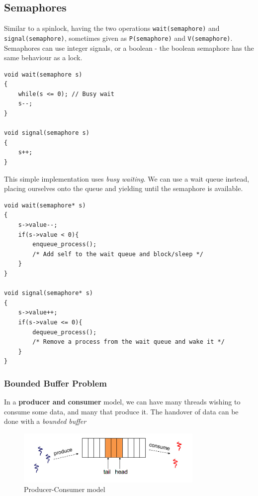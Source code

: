 \documentclass{article}
\begin{document}
\subsection{Semaphores}\label{semaphores}

Similar to a spinlock, having the two operations
\texttt{wait(semaphore)} and \texttt{signal(semaphore)}, sometimes given
as \texttt{P(semaphore)} and \texttt{V(semaphore)}. Semaphores can use
integer signals, or a boolean - the boolean semaphore has the same
behaviour as a lock.

\begin{verbatim}
void wait(semaphore s)
{
    while(s <= 0); // Busy wait
    s--;
}

void signal(semaphore s)
{
    s++;
}
\end{verbatim}

This simple implementation uses \emph{busy waiting}. We can use a wait
queue instead, placing ourselves onto the queue and yielding until the
semaphore is available.

\begin{verbatim}
void wait(semaphore* s)
{
    s->value--;
    if(s->value < 0){
        enqueue_process();
        /* Add self to the wait queue and block/sleep */
    }
}

void signal(semaphore* s)
{
    s->value++;
    if(s->value <= 0){
        dequeue_process();
        /* Remove a process from the wait queue and wake it */
    }
}
\end{verbatim}

\subsubsection{Bounded Buffer Problem}\label{bounded-buffer-problem}

In a \textbf{producer and consumer} model, we can have many threads
wishing to consume some data, and many that produce it. The handover of
data can be done with a \emph{bounded buffer}

\begin{figure}[h!]
  \centering
  \includegraphics[width=0.8\textwidth]{produceConsume}
  \caption{Producer-Consumer model}
\end{figure}
\end{document}
